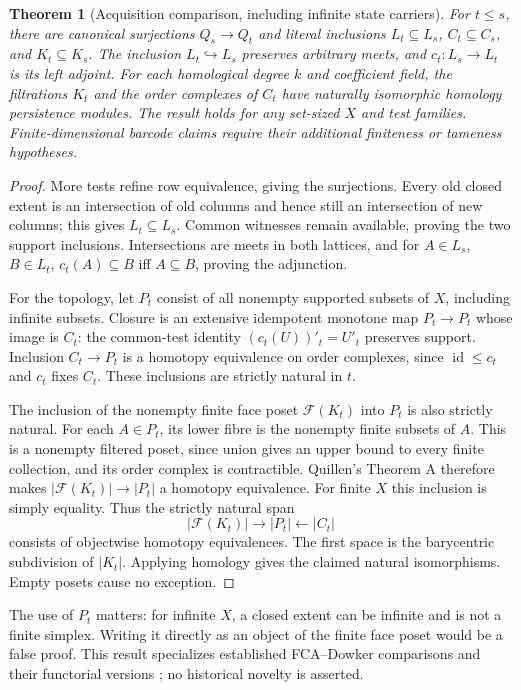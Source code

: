\documentclass[11pt]{article}
\newtheorem{theorem}{Theorem}[section]
\theoremstyle{definition}\newtheorem{definition}[theorem]{Definition}
\theoremstyle{remark}\newtheorem{remark}[theorem]{Remark}
\newcommand{\id}{\operatorname{id}}
\begin{document}
\begin{theorem}[Acquisition comparison, including infinite state carriers]
\label{thm:acquisition}
For $t\leq s$, there are canonical surjections $Q_s\to Q_t$ and literal
inclusions $L_t\subseteq L_s$, $C_t\subseteq C_s$, and $K_t\subseteq K_s$.
The inclusion $L_t\hookrightarrow L_s$ preserves arbitrary meets, and
$c_t:L_s\to L_t$ is its left adjoint. For each homological degree $k$ and
coefficient field, the filtrations $K_t$ and the order complexes of $C_t$
have naturally isomorphic homology persistence modules. The result holds
for any set-sized $X$ and test families. Finite-dimensional barcode claims
require their additional finiteness or tameness hypotheses.
\end{theorem}
\begin{proof}
More tests refine row equivalence, giving the surjections. Every old closed
extent is an intersection of old columns and hence still an intersection
of new columns; this gives $L_t\subseteq L_s$. Common witnesses remain
available, proving the two support inclusions. Intersections are meets in
both lattices, and for $A\in L_s$, $B\in L_t$,
$c_t(A)\subseteq B$ iff $A\subseteq B$, proving the adjunction.

For the topology, let $P_t$ consist of all nonempty supported subsets of
$X$, including infinite subsets. Closure is an extensive idempotent
monotone map $P_t\to P_t$ whose image is $C_t$: the common-test identity
$(c_t(U))'_t=U'_t$ preserves support. Inclusion $C_t\to P_t$ is a homotopy
equivalence on order complexes, since $\id\leq c_t$ and $c_t$ fixes $C_t$.
These inclusions are strictly natural in $t$.

The inclusion of the nonempty finite face poset $\mathcal F(K_t)$ into
$P_t$ is also strictly natural. For each $A\in P_t$, its lower fibre is
the nonempty finite subsets of $A$. This is a nonempty filtered poset,
since union gives an upper bound to every finite collection, and its
order complex is contractible. Quillen's Theorem A \cite{quillen}
therefore makes $|\mathcal F(K_t)|\to|P_t|$ a homotopy equivalence.
For finite $X$ this inclusion is simply equality. Thus the strictly natural
span
\[
 |\mathcal F(K_t)|\longrightarrow |P_t|\longleftarrow |C_t|
\]
consists of objectwise homotopy equivalences. The first space is the
barycentric subdivision of $|K_t|$. Applying homology gives the claimed
natural isomorphisms. Empty posets cause no exception.
\end{proof}
The use of $P_t$ matters: for infinite $X$, a closed extent can be infinite
and is not a finite simplex. Writing it directly as an object of the finite
face poset would be a false proof. This result specializes established
FCA--Dowker comparisons and their functorial versions
\cite{ayzenberg,brun,dowker}; no historical novelty is asserted.
\end{document}
